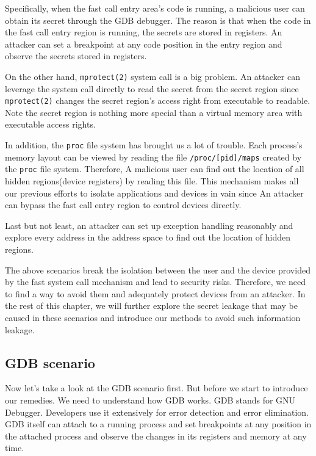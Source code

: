 Specifically, when the fast call entry area's code is running, a malicious 
user can obtain its secret through the GDB debugger. The reason is that when 
the code in the fast call entry region is running, the secrets are stored in 
registers. An attacker can set a breakpoint at any code position in the entry
 region and observe the secrets stored in registers.

On the other hand, \verb|mprotect(2)| system call is a big problem. An attacker 
can leverage the system call directly to read the secret from the secret 
region since \verb|mprotect(2)| changes the secret region's access right from 
executable to readable.  Note the secret region is nothing more special 
than a virtual memory area with executable access rights. 

In addition, the \verb|proc| file system has brought us a lot of trouble. 
Each process's memory layout can be viewed by reading the file \verb|/proc/[pid]/maps| 
created by the \verb|proc| file system. Therefore,  A malicious user can find out the 
location of all hidden regions(device registers) by reading this file. This 
mechanism makes all our previous efforts to isolate applications and devices 
in vain since An attacker can bypass the fast call entry region to control 
devices directly.  

Last but not least, an attacker can set up exception handling reasonably and 
explore every address in the address space to find out the location of hidden 
regions. 

The above scenarios break the isolation between the user and the device 
provided by the fast system call mechanism and lead to security risks. 
Therefore, we need to find a way to avoid them and adequately protect 
devices from an attacker. In the rest of this chapter, we will further 
explore the secret leakage that may be caused in these scenarios and 
introduce our methods to avoid such information leakage.

\subsection{GDB scenario}
Now let's take a look at the GDB scenario first. 
But before we start to introduce our remedies. We need to understand 
how GDB works. GDB stands for GNU Debugger. Developers use it extensively for error 
detection and error elimination. GDB itself can attach to a running 
process and set breakpoints at any position in the attached process 
and observe the changes in its registers and memory at any time. 


